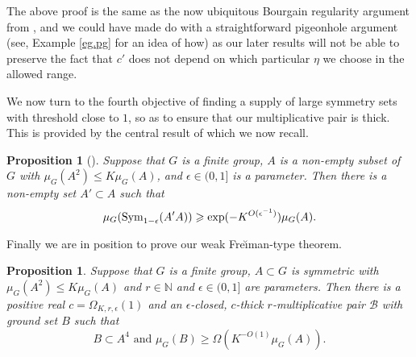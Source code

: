 \documentclass[12pt]{amsart}
\numberwithin{equation}{section}
\theoremstyle{plain}
\newtheorem{proposition}[subsection]{Proposition}
\theoremstyle{definition}
\renewcommand{\leq}{\leqslant}
\renewcommand{\geq}{\geqslant}
\providecommand{\Sym}{\mathop{\rm Sym}\nolimits}
\newcommand{\N}{\mathbb{N}}
\begin{document}
The above proof is the same as the now ubiquitous Bourgain regularity argument from \cite{JB}, and we could have made do with a straightforward pigeonhole argument (see, Example \ref{eg.pg} for an idea of how) as our later results will not be able to preserve the fact that $c'$ does not depend on which particular $\eta$ we choose in the allowed range.

We now turn to the fourth objective of finding a supply of large symmetry sets with threshold close to $1$, so as to ensure that our multiplicative pair is thick.  This is provided by the central result of \cite{TSBG} which we now recall.
\begin{proposition}[{\cite[Proposition 1.3]{TSBG}}]\label{prop.intit}
Suppose that $G$ is a finite group, $A$ is a non-empty subset of $G$ with $\mu_G(A^2) \leq K\mu_G(A)$, and $\epsilon \in (0,1]$ is a parameter. Then there is a non-empty set $A'\subset A$ such that
\begin{equation*}
\mu_G(\Sym_{1-\epsilon}(A'A)) \geq \exp(-K^{O(\epsilon^{-1})})\mu_G(A).
\end{equation*}
\end{proposition}
Finally we are in position to prove our weak Fre{\u\i}man-type theorem.
\begin{proposition}\label{prop.frcon}
Suppose that $G$ is a finite group, $A \subset G$ is symmetric with $\mu_G(A^2) \leq K\mu_G(A)$ and $r \in \N$ and $\epsilon \in (0,1]$ are parameters. Then there is a positive real $c=\Omega_{K,r,\epsilon}(1)$ and an $\epsilon$-closed, $c$-thick $r$-multiplicative pair $\mathcal{B}$ with ground set $B$ such that
\begin{equation*}
B \subset A^4 \textrm{ and }\mu_G(B)\geq\Omega(K^{-O(1)}\mu_G(A)).
\end{equation*}
\end{proposition}
\end{document}
